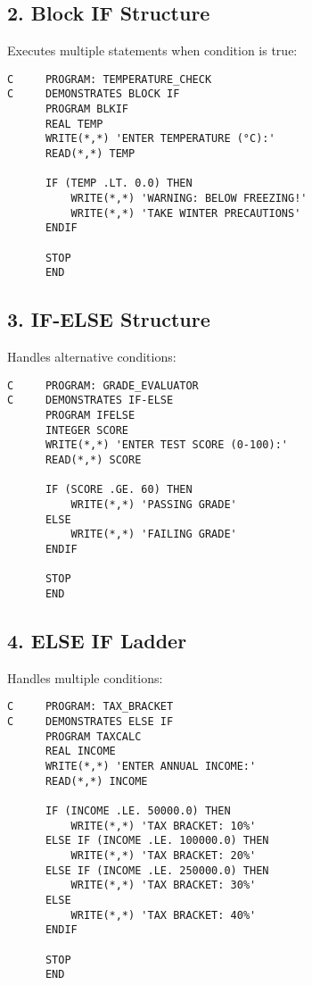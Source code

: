 \documentclass{book}
\begin{document}
\subsection*{2. Block IF Structure}
Executes multiple statements when condition is true:
\begin{verbatim}
C     PROGRAM: TEMPERATURE_CHECK
C     DEMONSTRATES BLOCK IF
      PROGRAM BLKIF
      REAL TEMP
      WRITE(*,*) 'ENTER TEMPERATURE (°C):'
      READ(*,*) TEMP
      
      IF (TEMP .LT. 0.0) THEN
          WRITE(*,*) 'WARNING: BELOW FREEZING!'
          WRITE(*,*) 'TAKE WINTER PRECAUTIONS'
      ENDIF
      
      STOP
      END
\end{verbatim}

\subsection*{3. IF-ELSE Structure}
Handles alternative conditions:
\begin{verbatim}
C     PROGRAM: GRADE_EVALUATOR
C     DEMONSTRATES IF-ELSE
      PROGRAM IFELSE
      INTEGER SCORE
      WRITE(*,*) 'ENTER TEST SCORE (0-100):'
      READ(*,*) SCORE
      
      IF (SCORE .GE. 60) THEN
          WRITE(*,*) 'PASSING GRADE'
      ELSE
          WRITE(*,*) 'FAILING GRADE'
      ENDIF
      
      STOP
      END
\end{verbatim}

\subsection*{4. ELSE IF Ladder}
Handles multiple conditions:
\begin{verbatim}
C     PROGRAM: TAX_BRACKET
C     DEMONSTRATES ELSE IF
      PROGRAM TAXCALC
      REAL INCOME
      WRITE(*,*) 'ENTER ANNUAL INCOME:'
      READ(*,*) INCOME
      
      IF (INCOME .LE. 50000.0) THEN
          WRITE(*,*) 'TAX BRACKET: 10%'
      ELSE IF (INCOME .LE. 100000.0) THEN
          WRITE(*,*) 'TAX BRACKET: 20%'
      ELSE IF (INCOME .LE. 250000.0) THEN
          WRITE(*,*) 'TAX BRACKET: 30%'
      ELSE
          WRITE(*,*) 'TAX BRACKET: 40%'
      ENDIF
      
      STOP
      END
\end{verbatim}
\end{document}
